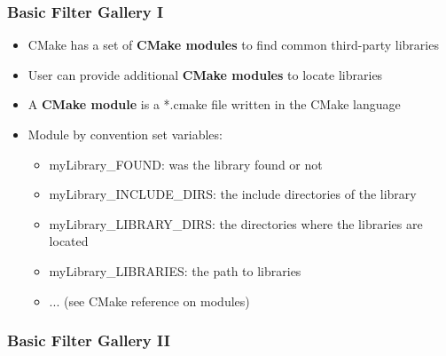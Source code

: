 \begin{frame}
  \frametitle{Basic Filter Gallery I}

    \begin{itemize}
      \item CMake has a set of \textbf{CMake modules} to find common third-party libraries
      \item User can provide additional \textbf{CMake modules} to locate libraries 
      \item A \textbf{CMake module} is a *.cmake file written in the CMake language 
      \item Module by convention set variables:
    \begin{itemize}
      \item myLibrary\_FOUND: was the library found or not 
      \item myLibrary\_INCLUDE\_DIRS: the include directories of the library  
      \item myLibrary\_LIBRARY\_DIRS: the directories where the libraries are located  
      \item myLibrary\_LIBRARIES: the path to libraries  
      \item ... (see CMake reference on modules)  
    \end{itemize}
    \end{itemize}

\end{frame}

\begin{frame}

  \frametitle{Basic Filter Gallery II}


\end{frame}

